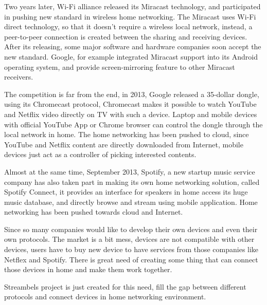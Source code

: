 Two years later, Wi-Fi alliance released its Miracast technology, and participated in pushing 
new standard in wireless home networking. The Miracast uses Wi-Fi direct technology, so that 
it doesn't require a wireless local network, instead, a peer-to-peer connection is created between 
the sharing and receiving devices. After its releasing, some major software and hardware companies 
soon accept the new standard. Google, for example integrated Miracast support into its Android 
operating system, and provide screen-mirroring feature to other Miracast receivers.

The competition is far from the end, in 2013, Google released a 35-dollar dongle, using its 
Chromecast protocol, Chromecast makes it possible to watch YouTube and Netflix video directly 
on TV with such a device. Laptop and mobile devices with official YouTube App or Chrome browser 
can control the dongle through the local network in home. The home networking has been pushed to 
cloud, since YouTube and Netflix content are directly downloaded from Internet, mobile devices 
just act as a controller of picking interested contents. 

Almost at the same time, September 2013, Spotify, a new startup music service company has also 
taken part in making its own home networking solution, called Spotify Connect, it provides an 
interface for speakers in home access its huge music database, and directly browse and stream 
using mobile application. Home networking has been pushed towards cloud and Internet.

Since so many companies would like to develop their own devices and even their own protocols. 
The market is a bit mess, devices are not compatible with other devices, users have to buy new 
device to have services from those companies like Netflex and Spotify. There is great need of 
creating some thing that can connect those devices in home and make them work together. 

Streambels project is just created for this need, fill the gap between different protocols and 
connect devices in home networking environment.



